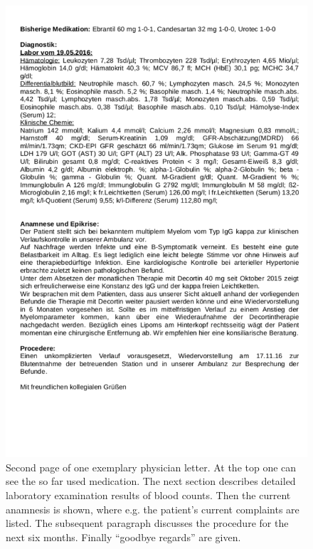 \begin{figure}[h]
	\centering
	\includegraphics[width=0.87\linewidth]{figures/Brief001_2}
	\caption{Second page of one exemplary physician letter. At the top one can see the so far used medication. The next section describes detailed laboratory examination results of blood counts. Then the current anamnesis is shown, where e.g. the patient's current complaints are listed. The subsequent paragraph discusses the procedure for the next six months. Finally ``goodbye regards'' are given.}
	\label{fig:letter_second_page}
\end{figure}

